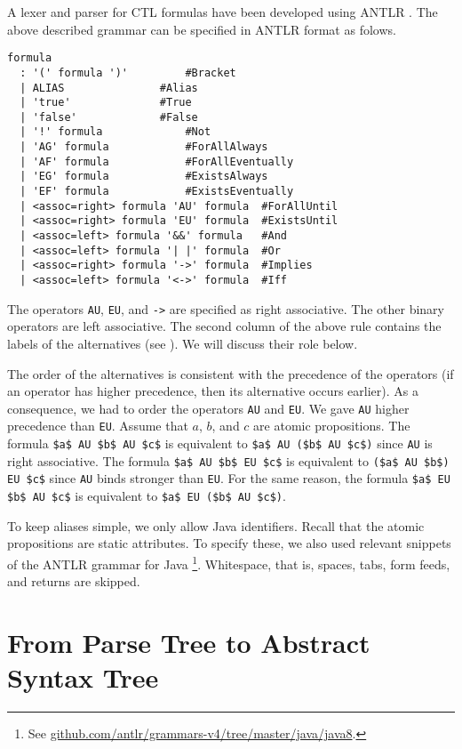 \documentclass[12pt]{article}
\theoremstyle{definition}
\begin{document}
A lexer and parser for CTL formulas have been developed using ANTLR \cite{P13}.  The above described grammar can be specified in ANTLR format as folows.
\begin{lstlisting}
formula
  : '(' formula ')'			#Bracket
  | ALIAS				#Alias
  | 'true'				#True
  | 'false'				#False
  | '!' formula				#Not
  | 'AG' formula			#ForAllAlways
  | 'AF' formula			#ForAllEventually
  | 'EG' formula			#ExistsAlways
  | 'EF' formula			#ExistsEventually
  | <assoc=right> formula 'AU' formula  #ForAllUntil
  | <assoc=right> formula 'EU' formula  #ExistsUntil
  | <assoc=left> formula '&&' formula	#And
  | <assoc=left> formula '| |' formula  #Or
  | <assoc=right> formula '->' formula  #Implies
  | <assoc=left> formula '<->' formula	#Iff
\end{lstlisting}
The operators \lstinline{AU}, \lstinline{EU}, and \lstinline{->} are specified as right associative.  The other binary operators are left associative.  The second column of the above rule contains the labels of the alternatives (see \cite[Section~8.2]{P13}).  We will discuss their role below.

The order of the alternatives is consistent with the precedence of the operators (if an operator has higher precedence, then its alternative occurs earlier).  As a consequence, we had to order the operators \lstinline{AU} and \lstinline{EU}.  We gave \lstinline{AU} higher precedence than \lstinline{EU}.  Assume that $a$, $b$, and $c$ are atomic propositions.  The formula \lstinline{$a$ AU $b$ AU $c$} is equivalent to \lstinline{$a$ AU ($b$ AU $c$)} since \lstinline{AU} is right associative.  The formula \lstinline{$a$ AU $b$ EU $c$} is equivalent to \lstinline{($a$ AU $b$) EU $c$} since \lstinline{AU} binds stronger than \lstinline{EU}.  For the same reason, the formula \lstinline{$a$ EU $b$ AU $c$} is equivalent to \lstinline{$a$ EU ($b$ AU $c$)}.

To keep aliases simple, we only allow Java identifiers.  Recall that the atomic propositions are static attributes.  To specify these, we also used relevant snippets of the ANTLR grammar for Java%
\footnote{See \href{https://github.com/antlr/grammars-v4/tree/master/java/java8}{github.com/antlr/grammars-v4/tree/master/java/java8}.}.  Whitespace, that is, spaces, tabs, form feeds, and returns are skipped.

\section{From Parse Tree to Abstract Syntax Tree}
\end{document}

